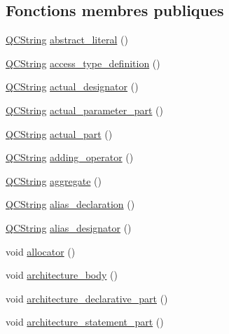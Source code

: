 \subsection*{Fonctions membres publiques}
\begin{DoxyCompactItemize}
\item 
\hyperlink{class_q_c_string}{Q\+C\+String} \hyperlink{classvhdl_1_1parser_1_1_vhdl_parser_a8a8836b10b1fa8e14fc1cbd4a0bcd83f}{abstract\+\_\+literal} ()
\item 
\hyperlink{class_q_c_string}{Q\+C\+String} \hyperlink{classvhdl_1_1parser_1_1_vhdl_parser_a4721495fc4772a74da2dcf6d489d8521}{access\+\_\+type\+\_\+definition} ()
\item 
\hyperlink{class_q_c_string}{Q\+C\+String} \hyperlink{classvhdl_1_1parser_1_1_vhdl_parser_a02306f4ae2d8f91c5bd6850dea73e7da}{actual\+\_\+designator} ()
\item 
\hyperlink{class_q_c_string}{Q\+C\+String} \hyperlink{classvhdl_1_1parser_1_1_vhdl_parser_a1633b2582148635869afa53ae0621603}{actual\+\_\+parameter\+\_\+part} ()
\item 
\hyperlink{class_q_c_string}{Q\+C\+String} \hyperlink{classvhdl_1_1parser_1_1_vhdl_parser_ab37d382f61a7881be3669786d26a0c49}{actual\+\_\+part} ()
\item 
\hyperlink{class_q_c_string}{Q\+C\+String} \hyperlink{classvhdl_1_1parser_1_1_vhdl_parser_a3c00bee6f789aa80942559f113dbdd69}{adding\+\_\+operator} ()
\item 
\hyperlink{class_q_c_string}{Q\+C\+String} \hyperlink{classvhdl_1_1parser_1_1_vhdl_parser_a484fb9fafc6df29ba93a1bfb9b722372}{aggregate} ()
\item 
\hyperlink{class_q_c_string}{Q\+C\+String} \hyperlink{classvhdl_1_1parser_1_1_vhdl_parser_a46a675a912f9d666a475e2a56c86bb85}{alias\+\_\+declaration} ()
\item 
\hyperlink{class_q_c_string}{Q\+C\+String} \hyperlink{classvhdl_1_1parser_1_1_vhdl_parser_a80c2b8a42fe1a763383b6dde31fe5913}{alias\+\_\+designator} ()
\item 
void \hyperlink{classvhdl_1_1parser_1_1_vhdl_parser_aa8bf1bf5990f2f99ee68004da7f62d12}{allocator} ()
\item 
void \hyperlink{classvhdl_1_1parser_1_1_vhdl_parser_a17c2425a64f11952f0ae77b2973a47c8}{architecture\+\_\+body} ()
\item 
void \hyperlink{classvhdl_1_1parser_1_1_vhdl_parser_ac341cd9a398755e13a0c0084d8ffab4b}{architecture\+\_\+declarative\+\_\+part} ()
\item 
void \hyperlink{classvhdl_1_1parser_1_1_vhdl_parser_aa49b8ab5f476b0fa02e82dcceb181a59}{architecture\+\_\+statement\+\_\+part} ()

\end{DoxyCompactItemize}
